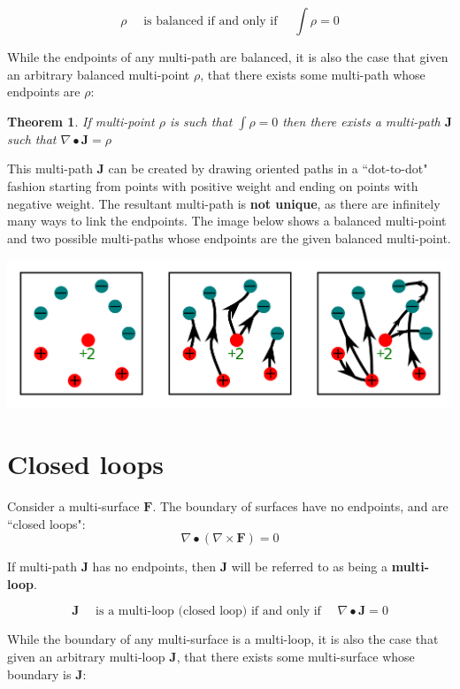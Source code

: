 \documentclass{book}
\newtheorem{thm}{Theorem}
\begin{document}
\[\rho \quad\text{ is balanced if and only if }\quad \int \rho = 0\]

While the endpoints of any multi-path are balanced, it is also the case that given an arbitrary balanced multi-point \(\rho\), that there exists some multi-path whose endpoints are \(\rho\):

\begin{thm}
If multi-point \(\rho\) is such that \(\int \rho = 0\) then there exists a multi-path \(\mathbf{J}\) such that \(\nabla \bullet \mathbf{J} = \rho\)
\end{thm}

This multi-path \(\mathbf{J}\) can be created by drawing oriented paths in a ``dot-to-dot" fashion starting from points with positive weight and ending on points with negative weight. The resultant multi-path is {\bf not unique}, as there are infinitely many ways to link the endpoints. The image below shows a balanced multi-point and two possible multi-paths whose endpoints are the given balanced multi-point. 

\begin{center}
\includegraphics[width = \textwidth]{Boundaries/Path_endpoints/dot-to-dot}
\end{center}




\section{Closed loops}

Consider a multi-surface \(\mathbf{F}\). The boundary of surfaces have no endpoints, and are ``closed loops":
\[\nabla \bullet (\nabla \times \mathbf{F}) = 0\]    

If multi-path \(\mathbf{J}\) has no endpoints, then \(\mathbf{J}\) will be referred to as being a {\bf multi-loop}.

\[\mathbf{J} \quad\text{ is a multi-loop (closed loop) if and only if }\quad \nabla \bullet \mathbf{J} = 0\]

While the boundary of any multi-surface is a multi-loop, it is also the case that given an arbitrary multi-loop \(\mathbf{J}\), that there exists some multi-surface whose boundary is \(\mathbf{J}\):
\end{document}
